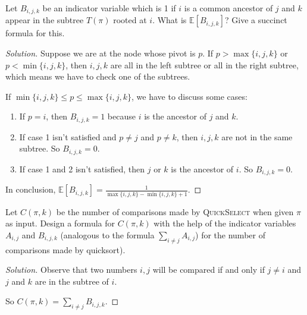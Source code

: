 


\maketitle

\begin{thm}{}{}
    Let $B_{i,j,k}$ be an indicator variable which is 1 if $i$ is a common ancestor of  $j$ and $k$ appear in the subtree $T(\pi)$ rooted at $i$.
    What is $\mathbb{E}[B_{i,j,k}]$? Give a succinct formula for this.
\end{thm}

\begin{proof}[Solution]
  	Suppose we are at the node whose pivot is $p$. If $p > \max\{i,j,k\}$ or $p < \min\{i,j,k\}$, then $i,j,k$ are all in the left subtree or all in the right subtree, which means we have to check one of the subtrees.
      
    If $\min\{i,j,k\} \leqslant p \leqslant \max\{i,j,k\}$, we have to discuss some cases:
    \begin{enumerate}
        \item If $p=i$, then $B_{i,j,k}=1$ because $i$ is the ancestor of $j$ and $k$.
        \item If case 1 isn't satisfied and $p\ne j$ and $p\ne k$, then $i,j,k$ are not in the same subtree. So $B_{i,j,k}=0$.
        \item If case 1 and 2 isn't satisfied, then $j$ or $k$ is the ancestor of $i$. So $B_{i,j,k}=0$.
    \end{enumerate}
  	
  	In conclusion, $\mathbb{E}[B_{i,j,k}]=\frac{1}{\max\{i,j,k\}-\min\{i,j,k\}+1}$.
\end{proof}

\newpage

\begin{thm}{}{}
	Let $C(\pi,k)$ be the number of comparisons made by \textsc{QuickSelect} when given $\pi$ as input. Design a formula for $C(\pi,k)$ with the help of the indicator variables $A_{i,j}$ and $B_{i,j,k}$ (analogous to the formula $\sum_{i\ne j}A_{i,j}$) for the number of comparisons made by quicksort).
	
\end{thm}

\begin{proof}[Solution]
	Observe that two numbers $i,j$ will be compared if and only if $j\ne i$ and $j$ and $k$ are in the subtree of $i$.
	
	So $C(\pi,k)=\sum_{i\ne j}B_{i,j,k}$.
\end{proof}





